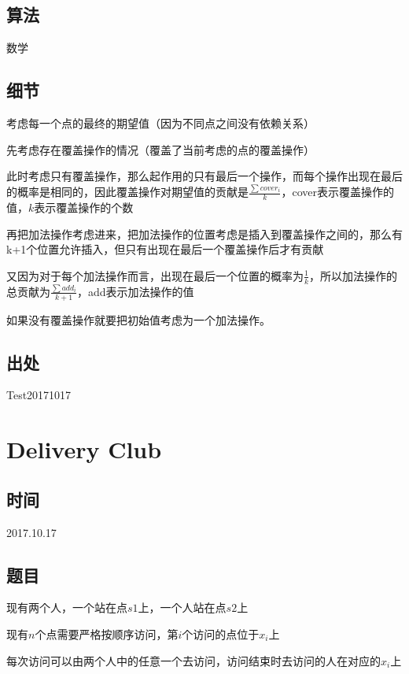 \documentclass[a4paper]{article}
\begin{document}
	\subsection{算法}
		
		数学
		
	\subsection{细节}
		
		考虑每一个点的最终的期望值（因为不同点之间没有依赖关系）
		
		先考虑存在覆盖操作的情况（覆盖了当前考虑的点的覆盖操作）
		
		此时考虑只有覆盖操作，那么起作用的只有最后一个操作，而每个操作出现在最后的概率是相同的，因此覆盖操作对期望值的贡献是$\frac{\sum cover_i}{k}$，cover表示覆盖操作的值，$k$表示覆盖操作的个数
		
		再把加法操作考虑进来，把加法操作的位置考虑是插入到覆盖操作之间的，那么有k+1个位置允许插入，但只有出现在最后一个覆盖操作后才有贡献
		
		又因为对于每个加法操作而言，出现在最后一个位置的概率为$\frac{1}{k}$，所以加法操作的总贡献为$\frac{\sum add_i}{k + 1}$，add表示加法操作的值
		
		如果没有覆盖操作就要把初始值考虑为一个加法操作。
		
	\subsection{出处}
		
		Test20171017
	
	\newpage
	
	\section{Delivery Club}
	\subsection{时间}
		
		2017.10.17
		
	\subsection{题目}
		
		现有两个人，一个站在点$s1$上，一个人站在点$s2$上
		
		现有$n$个点需要严格按顺序访问，第$i$个访问的点位于$x_i$上
		
		每次访问可以由两个人中的任意一个去访问，访问结束时去访问的人在对应的$x_i$上
		
\end{document}
